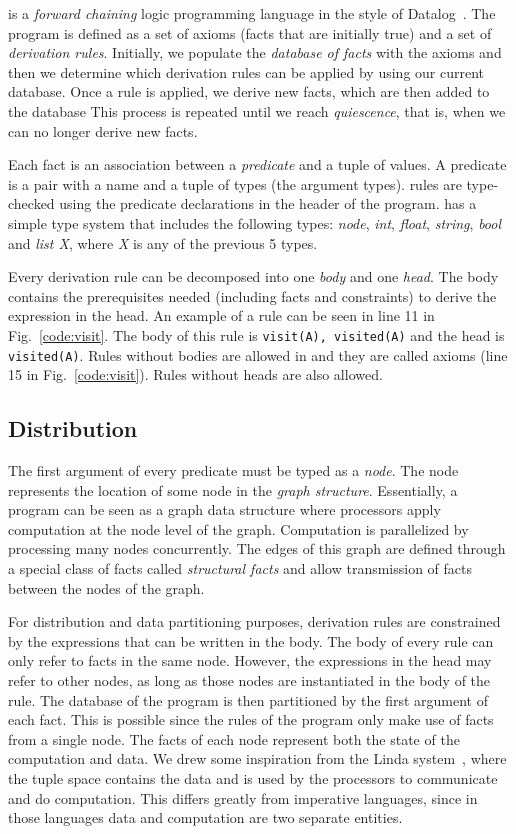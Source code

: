 \lang is a \emph{forward chaining} logic programming language in the style of Datalog~\cite{Ullman:1990:PDK:533142}. The program is defined as a set of axioms (facts that are initially true) and a set of \emph{derivation rules}. Initially, we populate the \emph{database of facts} with the axioms and then we determine which derivation rules can be applied by using our current database. Once a rule is applied, we derive new facts, which are then added to the database
This process is repeated until we reach \emph{quiescence}, that is, when we can no longer derive new facts.

Each fact is an association between a \emph{predicate} and a tuple of values. A predicate is a pair with a name and a tuple of types (the argument types). \lang rules are type-checked using the predicate declarations in the header of the program. \lang has a simple type system that includes the following types: \emph{node}, \emph{int}, \emph{float}, \emph{string}, \emph{bool} and \emph{list X}, where \emph{X} is any of the previous 5 types.

Every derivation rule can be decomposed into one \emph{body} and one \emph{head}.
The body contains the prerequisites needed (including facts and constraints) to derive the expression in the head.
An example of a rule can be seen in line 11 in Fig.~\ref{code:visit}.
The body of this rule is \texttt{visit(A), visited(A)} and the head is \texttt{visited(A)}.
Rules without bodies are allowed in \lang and they are called axioms (line 15 in Fig.~\ref{code:visit}). Rules without heads are also allowed.

\subsection{Distribution}

The first argument of every predicate must be typed as a \emph{node}. The node represents the location of some node in the \emph{graph structure}.
Essentially, a program can be seen as a graph data structure where processors apply computation at the node level of the graph. Computation is
parallelized by processing many nodes concurrently. The edges of this graph are defined through a special class of facts called \emph{structural facts}
and allow transmission of facts between the nodes of the graph.

For distribution and data partitioning purposes, derivation rules are constrained by the expressions that can be written in the body.
The body of every rule can only refer to facts in the same node.
However, the expressions in the head may refer to other nodes, as long as those nodes are instantiated in the body of the rule.
The database of the program is then partitioned by the first argument of each fact. This is possible since the rules of the
program only make use of facts from a single node. The facts of each node represent both the state of the computation and data.
We drew some inspiration from the Linda system~\cite{1663305}, where the tuple space contains the data and is used by the processors
to communicate and do computation.
This differs greatly from imperative languages, since in those languages data and computation are two separate entities.

